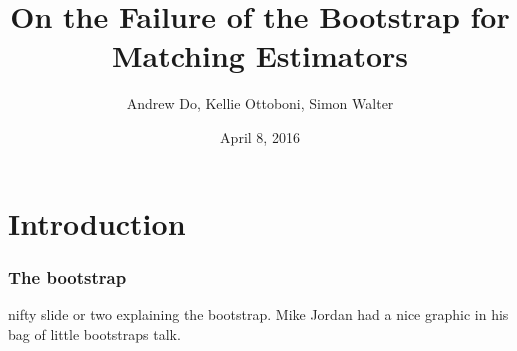 \documentclass{beamer}
\title{On the Failure of the Bootstrap for Matching Estimators}
\author{Andrew Do, Kellie Ottoboni, Simon Walter}
\date{April 8, 2016}
\begin{document}
\frame{\titlepage}

\section[Outline]{}
\frame{\tableofcontents}

\section{Introduction}


\frame
{
  \frametitle{The bootstrap}

nifty slide or two explaining the bootstrap. Mike Jordan had a nice graphic in his bag of little bootstraps talk.
}
\end{document}
